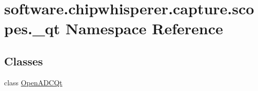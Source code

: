 \hypertarget{namespacesoftware_1_1chipwhisperer_1_1capture_1_1scopes_1_1__qt}{}\section{software.\+chipwhisperer.\+capture.\+scopes.\+\_\+qt Namespace Reference}
\label{namespacesoftware_1_1chipwhisperer_1_1capture_1_1scopes_1_1__qt}
\subsection*{Classes}
\begin{DoxyCompactItemize}
\item 
class \hyperlink{classsoftware_1_1chipwhisperer_1_1capture_1_1scopes_1_1__qt_1_1OpenADCQt}{Open\+A\+D\+C\+Qt}
\end{DoxyCompactItemize}
